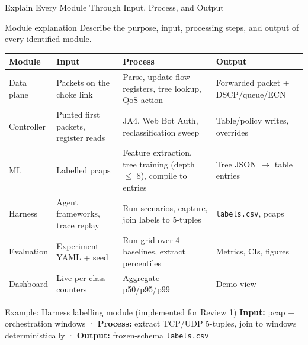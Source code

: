 \documentclass[aspectratio=169,11pt]{beamer}
\begin{document}
\begin{frame}{Explain Every Module Through Input, Process, and Output}
  \begin{block}{Module explanation}
    Describe the purpose, input, processing steps, and output of every identified module.
  \end{block}
  \vspace{-0.2em}
  {\scriptsize
  \begin{center}
  \begin{tabular}{@{}p{2.1cm}p{3.1cm}p{3.4cm}p{3.2cm}@{}}
    \toprule
    \textbf{Module} & \textbf{Input} & \textbf{Process} & \textbf{Output}\\
    \midrule
    Data plane & Packets on the choke link & Parse, update flow registers, tree lookup, QoS action
      & Forwarded packet + DSCP/queue/ECN\\
    Controller & Punted first packets, register reads & JA4, Web Bot Auth, reclassification sweep
      & Table/policy writes, overrides\\
    ML & Labelled pcaps & Feature extraction, tree training (depth $\leq$ 8), compile to entries
      & Tree JSON $\to$ table entries\\
    Harness & Agent frameworks, trace replay & Run scenarios, capture, join labels to 5-tuples
      & \texttt{labels.csv}, pcaps\\
    Evaluation & Experiment YAML + seed & Run grid over 4 baselines, extract percentiles
      & Metrics, CIs, figures\\
    Dashboard & Live per-class counters & Aggregate p50/p95/p99 & Demo view\\
    \bottomrule
  \end{tabular}
  \end{center}}
  \vspace{0.1em}
  \begin{alertblock}{Example: Harness labelling module (implemented for Review 1)}
    \footnotesize \textbf{Input:} pcap + orchestration windows ·
    \textbf{Process:} extract TCP/UDP 5-tuples, join to windows deterministically ·
    \textbf{Output:} frozen-schema \texttt{labels.csv}
  \end{alertblock}
\end{frame}
\end{document}
